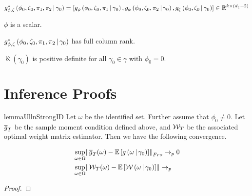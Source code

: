 \documentclass[11pt, letterpaper, twoside, final]{article}
\begin{document}
\begin{appendices}
  \begin{defn}{\popmom*}
    \begin{equation}
      g_{\phi, \zeta}^{*}\left(\phi_0, \zeta_0, \pi_1, \pi_2 \,\middle\vert\, \gamma_0\right) =
      \left[g_{\phi}\left(\phi_0, \zeta_0, \pi_1 \,\middle\vert\, \gamma_0\right) , g_{\phi}\left(\phi_0, \zeta_0,
      \pi_2 \,\middle\vert\, \gamma_0\right) , g_{\zeta} \left(\phi_0, \zeta_0 \,\middle\vert\, \gamma_0\right) \right] \in
      \mathbb{R}^{k \times (d_{\zeta} + 2)}
    \end{equation}
  \end{defn}


  \begin{assump}[GMM 4]\label{ass:GMM4}
  \begin{assumplist}
    \item $\phi$ is a scalar.
      \label{ass:GMM4a}
    \item $g_{\phi, \zeta}^{*}\left(\phi_0, \zeta_0, \pi_1, \pi_2 \,\middle\vert\, \gamma_0\right)$ has full column
      rank. 
      \label{ass:GMM4b}
    \item $\aleph(\gamma_0)$ is positive definite for all $\gamma_0 \in \gamma $ with $\phi_0 = 0$. 
      \label{ass:GMM4c}
  \end{assumplist}
  \end{assump}

\section{Inference Proofs}


\begin{restatable}{lemma}{UllnStrongID}
  \label{lemma:UniformConvergenceStrongID}
  Let $\omega$ be the identified set.
  Further assume that $\phi_0 \neq 0$. 
  Let $\overline{g}_T$ be the sample moment condition defined above, and $\mathcal{W}_T$ be the associated optimal weight matrix
  estimator.
  Then we have the following convergence.

  \begin{align}
    &\sup_{\omega \in \Omega} \norm*{\sampmom(\omega) - \E\left[g\left(\omega \mvert
     \gamma_0\right)\right]}_{Fro} \pto 0 \\ 
    &\sup_{\omega \in \Omega} \norm{\W_{T}(\omega)-\E\left[\W\left(\omega \mvert \gamma_0\right)\right]} \pto 
  \end{align}

\end{restatable}

\begin{proof}


\end{proof}
\end{appendices}
\end{document}
